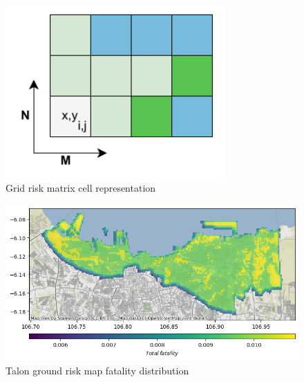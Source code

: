 \documentclass[12pt]{report}
\begin{document}
        \begin{figure}[H]
            \centering
            \includegraphics[width=0.75\textwidth]{General Image/OSM Drone-RISK.pdf}
            \caption{Grid risk matrix cell representation}
            \label{fig:riskmatrix}
        \end{figure}

        \begin{figure}[H]
            \centering
            \includegraphics[width=\textwidth]{Plot/talon/total_fatality.png}
            \caption{Talon ground risk map fatality distribution}
            \label{fig:riskmap}
        \end{figure}
\end{document}
